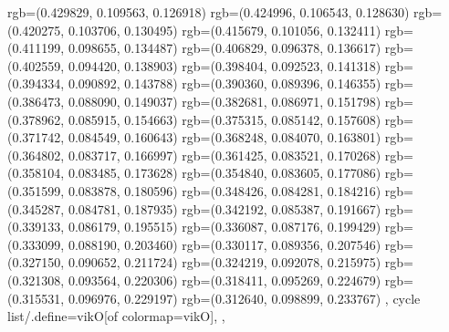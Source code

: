 {{{					rgb=(0.429829, 0.109563, 0.126918)
					rgb=(0.424996, 0.106543, 0.128630)
					rgb=(0.420275, 0.103706, 0.130495)
					rgb=(0.415679, 0.101056, 0.132411)
					rgb=(0.411199, 0.098655, 0.134487)
					rgb=(0.406829, 0.096378, 0.136617)
					rgb=(0.402559, 0.094420, 0.138903)
					rgb=(0.398404, 0.092523, 0.141318)
					rgb=(0.394334, 0.090892, 0.143788)
					rgb=(0.390360, 0.089396, 0.146355)
					rgb=(0.386473, 0.088090, 0.149037)
					rgb=(0.382681, 0.086971, 0.151798)
					rgb=(0.378962, 0.085915, 0.154663)
					rgb=(0.375315, 0.085142, 0.157608)
					rgb=(0.371742, 0.084549, 0.160643)
					rgb=(0.368248, 0.084070, 0.163801)
					rgb=(0.364802, 0.083717, 0.166997)
					rgb=(0.361425, 0.083521, 0.170268)
					rgb=(0.358104, 0.083485, 0.173628)
					rgb=(0.354840, 0.083605, 0.177086)
					rgb=(0.351599, 0.083878, 0.180596)
					rgb=(0.348426, 0.084281, 0.184216)
					rgb=(0.345287, 0.084781, 0.187935)
					rgb=(0.342192, 0.085387, 0.191667)
					rgb=(0.339133, 0.086179, 0.195515)
					rgb=(0.336087, 0.087176, 0.199429)
					rgb=(0.333099, 0.088190, 0.203460)
					rgb=(0.330117, 0.089356, 0.207546)
					rgb=(0.327150, 0.090652, 0.211724)
					rgb=(0.324219, 0.092078, 0.215975)
					rgb=(0.321308, 0.093564, 0.220306)
					rgb=(0.318411, 0.095269, 0.224679)
					rgb=(0.315531, 0.096976, 0.229197)
					rgb=(0.312640, 0.098899, 0.233767)
			},
		cycle list/.define={vikO}{[of colormap=vikO]},
		},
}